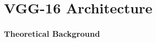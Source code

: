 \documentclass[a4paper,12pt]{article}
\begin{document}




\section{VGG-16 Architecture}
\citep{simonyan2014vgg}
\subsubsection{Theoretical Background}
\end{document}
